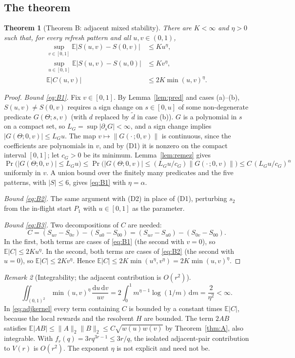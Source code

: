 \documentclass[11pt]{article}
\newtheorem{theorem}{Theorem}[section]
\theoremstyle{remark}\newtheorem{remark}[theorem]{Remark}
\newcommand{\E}{\mathbb E}
\newcommand{\dd}{\mathrm d}
\begin{document}
\subsection{The theorem}
\begin{theorem}[Theorem B: adjacent mixed stability]\label{thm:B}
There are $K<\infty$ and $\eta>0$ such that, for every refresh pattern and all $u,v\in(0,1)$,
\begin{align}
\sup_{v\in[0,1]}\E|S(u,v)-S(0,v)|&\le Ku^{\eta},\label{eq:B1}\\
\sup_{u\in[0,1]}\E|S(u,v)-S(u,0)|&\le Kv^{\eta},\label{eq:B2}\\
\E|C(u,v)|&\le 2K\min(u,v)^{\eta}.\label{eq:B3}
\end{align}
\end{theorem}
\begin{proof}
\emph{Bound \eqref{eq:B1}.} Fix $v\in[0,1]$. By Lemma~\ref{lem:pred} and cases (a)--(b), $S(u,v)\ne S(0,v)$ requires a sign change on $s\in[0,u]$ of some non-degenerate predicate $G(\Theta;s,v)$ (with $d$ replaced by $\tilde d$ in case (b)). $G$ is a polynomial in $s$ on a compact set, so $L_G=\sup|\partial_sG|<\infty$, and a sign change implies $|G(\Theta;0,v)|\le L_Gu$. The map $v\mapsto\|G(\cdot\,;0,v)\|$ is continuous, since the coefficients are polynomials in $v$, and by (D1) it is nonzero on the compact interval $[0,1]$; let $c_G>0$ be its minimum. Lemma~\ref{lem:remez} gives
\[
\Pr\bigl(|G(\Theta;0,v)|\le L_Gu\bigr)\le\Pr\bigl(|G(\Theta;0,v)|\le (L_Gu/c_G)\|G(\cdot\,;0,v)\|\bigr)\le C\,(L_Gu/c_G)^{\alpha}
\]
uniformly in $v$. A union bound over the finitely many predicates and the five patterns, with $|S|\le6$, gives \eqref{eq:B1} with $\eta=\alpha$.

\emph{Bound \eqref{eq:B2}.} The same argument with (D2) in place of (D1), perturbing $s_2$ from the in-flight start $P_1$ with $u\in[0,1]$ as the parameter.

\emph{Bound \eqref{eq:B3}.} Two decompositions of $C$ are needed:
\[
C=(S_{uv}-S_{0v})-(S_{u0}-S_{00})=(S_{uv}-S_{u0})-(S_{0v}-S_{00}).
\]
In the first, both terms are cases of \eqref{eq:B1} (the second with $v=0$), so $\E|C|\le2Ku^{\eta}$. In the second, both terms are cases of \eqref{eq:B2} (the second with $u=0$), so $\E|C|\le2Kv^{\eta}$. Hence $\E|C|\le2K\min(u^{\eta},v^{\eta})=2K\min(u,v)^{\eta}$.
\end{proof}

\begin{remark}[Integrability; the adjacent contribution is $O(r^2)$]
\[\iint_{(0,1)^2}\min(u,v)^{\eta}\,\frac{\dd u\,\dd v}{uv}=2\int_0^1m^{\eta-1}\log(1/m)\,\dd m=\frac{2}{\eta^2}<\infty.\]In \eqref{eq:adjkernel} every term containing $C$ is bounded by a constant times $\E|C|$, because the local rewards and the resolvent $H$ are bounded. The term $2AB$ satisfies $\E|AB|\le\|A\|_2\|B\|_2\le C\sqrt{w(u)w(v)}$ by Theorem~\ref{thm:A}, also integrable. With $f_r(q)=3rq^{3r-1}\le3r/q$, the isolated adjacent-pair contribution to $V(r)$ is $O(r^2)$. The exponent $\eta$ is not explicit and need not be.
\end{remark}
\end{document}
